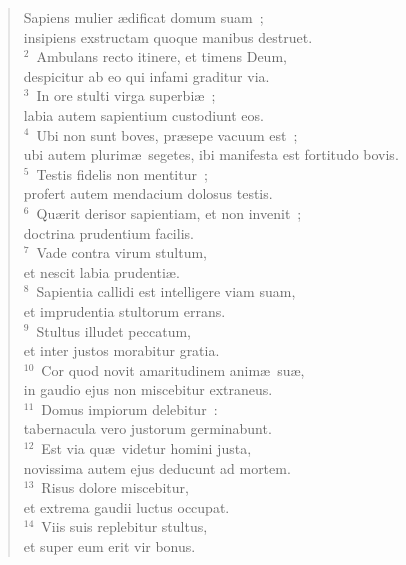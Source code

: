 \begin{flushleft}\begin{verse}\vspace{-19pt}\hspace{6pt}Sapiens mulier \ae dificat domum suam~;\\\hspace{6pt} insipiens exstructam quoque manibus destruet.\\
${}^{2}$~Ambulans recto itinere, et timens Deum,\\ despicitur ab eo qui infami graditur via.\\
${}^{3}$~In ore stulti virga superbi\ae~;\\ labia autem sapientium custodiunt eos.\\
${}^{4}$~Ubi non sunt boves, pr\ae sepe vacuum est~;\\ ubi autem plurim\ae\ segetes, ibi manifesta est fortitudo bovis.\\
${}^{5}$~Testis fidelis non mentitur~;\\ profert autem mendacium dolosus testis.\\
${}^{6}$~Qu\ae rit derisor sapientiam, et non invenit~;\\ doctrina prudentium facilis.\\
${}^{7}$~Vade contra virum stultum,\\ et nescit labia prudenti\ae .\\
${}^{8}$~Sapientia callidi est intelligere viam suam,\\ et imprudentia stultorum errans.\\
${}^{9}$~Stultus illudet peccatum,\\ et inter justos morabitur gratia.\\
${}^{10}$~Cor quod novit amaritudinem anim\ae\ su\ae ,\\ in gaudio ejus non miscebitur extraneus.\\
${}^{11}$~Domus impiorum delebitur~:\\ tabernacula vero justorum germinabunt.\\
${}^{12}$~Est via qu\ae\ videtur homini justa,\\ novissima autem ejus deducunt ad mortem.\\
${}^{13}$~Risus dolore miscebitur,\\ et extrema gaudii luctus occupat.\\
${}^{14}$~Viis suis replebitur stultus,\\ et super eum erit vir bonus.\end{verse}\end{flushleft}


